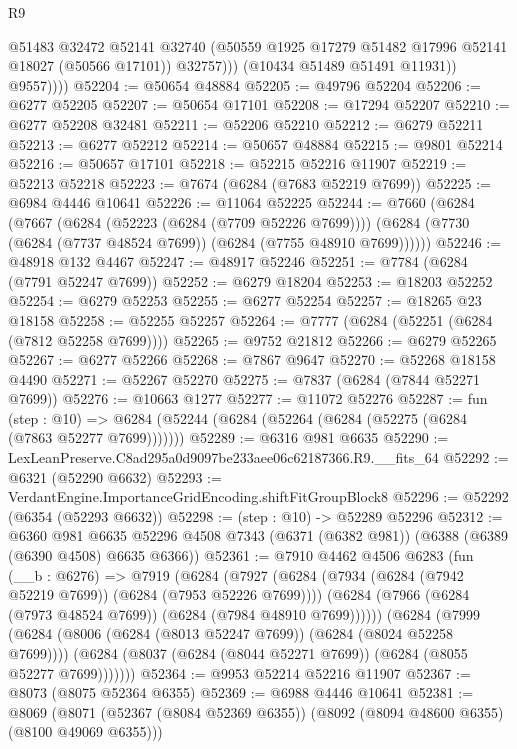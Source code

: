 \begin{lexlean}{R9}
\begin{coremodule}
                    @51483
                    @32472
                    @52141
                    @32740
                    (@50559 @1925 @17279 @51482 @17996 @52141 @18027 (@50566 @17101))
                    @32757)))
              (@10434 @51489 @51491 @11931))
            @9557))))
@52204 := @50654 @48884
@52205 := @49796 @52204
@52206 := @6277 @52205
@52207 := @50654 @17101
@52208 := @17294 @52207
@52210 := @6277 @52208 @32481
@52211 := @52206 @52210
@52212 := @6279 @52211
@52213 := @6277 @52212
@52214 := @50657 @48884
@52215 := @9801 @52214
@52216 := @50657 @17101
@52218 := @52215 @52216 @11907
@52219 := @52213 @52218
@52223 := @7674 (@6284 (@7683 @52219 @7699))
@52225 := @6984 @4446 @10641
@52226 := @11064 @52225
@52244 := @7660
    (@6284
      (@7667
        (@6284 (@52223 (@6284 (@7709 @52226 @7699))))
        (@6284 (@7730 (@6284 (@7737 @48524 @7699)) (@6284 (@7755 @48910 @7699))))))
@52246 := @48918 @132 @4467
@52247 := @48917 @52246
@52251 := @7784 (@6284 (@7791 @52247 @7699))
@52252 := @6279 @18204
@52253 := @18203 @52252
@52254 := @6279 @52253
@52255 := @6277 @52254
@52257 := @18265 @23 @18158
@52258 := @52255 @52257
@52264 := @7777 (@6284 (@52251 (@6284 (@7812 @52258 @7699))))
@52265 := @9752 @21812
@52266 := @6279 @52265
@52267 := @6277 @52266
@52268 := @7867 @9647
@52270 := @52268 @18158 @4490
@52271 := @52267 @52270
@52275 := @7837 (@6284 (@7844 @52271 @7699))
@52276 := @10663 @1277
@52277 := @11072 @52276
@52287 := fun (step : @10) =>
  @6284 (@52244 (@6284 (@52264 (@6284 (@52275 (@6284 (@7863 @52277 @7699)))))))
@52289 := @6316 @981 @6635
@52290 := LexLeanPreserve.C8ad295a0d9097be233aee06c62187366.R9.__fits_64
@52292 := @6321 (@52290 @6632)
@52293 := VerdantEngine.ImportanceGridEncoding.shiftFitGroupBlock8
@52296 := @52292 (@6354 (@52293 @6632))
@52298 := (step : @10) -> @52289 @52296
@52312 := @6360
    @981
    @6635
    @52296
    @4508
    @7343
    (@6371 (@6382 @981))
    (@6388 (@6389 (@6390 @4508) @6635 @6366))
@52361 := @7910
    @4462
    @4506
    @6283
    (fun (__b : @6276) =>
    @7919
      (@6284
        (@7927
          (@6284 (@7934 (@6284 (@7942 @52219 @7699)) (@6284 (@7953 @52226 @7699))))
          (@6284 (@7966 (@6284 (@7973 @48524 @7699)) (@6284 (@7984 @48910 @7699))))))
      (@6284
        (@7999
          (@6284 (@8006 (@6284 (@8013 @52247 @7699)) (@6284 (@8024 @52258 @7699))))
          (@6284 (@8037 (@6284 (@8044 @52271 @7699)) (@6284 (@8055 @52277 @7699)))))))
@52364 := @9953 @52214 @52216 @11907
@52367 := @8073 (@8075 @52364 @6355)
@52369 := @6988 @4446 @10641
@52381 := @8069
    (@8071 (@52367 (@8084 @52369 @6355)) (@8092 (@8094 @48600 @6355) (@8100 @49069 @6355)))

\end{coremodule}
\end{lexlean}
